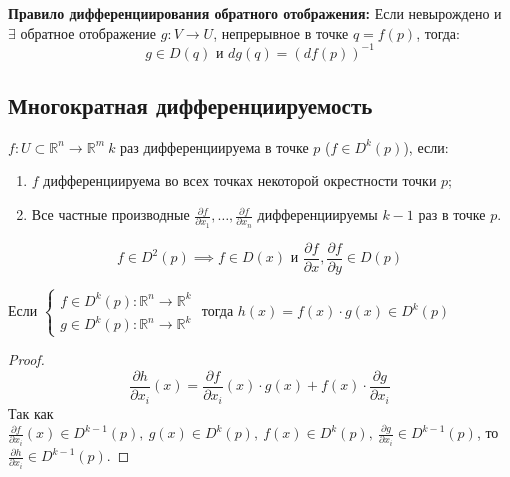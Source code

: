 \textbf{Правило дифференциирования обратного отображения:}
Если невырождено и $\exists$ обратное отображение $g:V \to U$, непрерывное в точке $q = f(p)$, тогда:
\[g \in D(q) \text{ и } dg(q) = (df(p))^{-1}\]


\subsection{Многократная дифференциируемость}

\begin{definition}
    $f: U \subset \mathbb{R}^n \to \mathbb{R}^m \ k$ раз дифференциируема в точке $p$ ($f \in D^k(p)$), если:
    \begin{enumerate}
        \item $f$ дифференциируема во всех точках некоторой окрестности точки $p$;
        \item Все частные производные $\frac{\partial f}{\partial x_1}, \dots, \frac{\partial f}{\partial x_n}$ дифференциируемы $k-1$ раз в точке $p$.
    \end{enumerate}  
\end{definition}

\begin{example}
    \[f \in D^2(p) \implies f \in D(x) \text{ и } \frac{\partial f}{\partial x}, \frac{\partial f}{\partial y} \in D(p)  \]
\end{example}

\begin{statement*}
    Если $\begin{cases}
        f \in D^k(p): \mathbb{R}^n \to \mathbb{R}^k\\
        g \in D^k(p): \mathbb{R}^n \to \mathbb{R}^k
    \end{cases}$ тогда $h(x) = f(x) \cdot g(x) \in D^k(p)$

    \begin{proof}
        \begin{equation*}
            \frac{\partial h}{\partial x_i}(x) = \frac{\partial f}{\partial x_i}(x)\cdot g(x) +
            f(x) \cdot \frac{\partial g}{\partial x_i}
        \end{equation*}
        Так как $\frac{\partial f}{\partial x_i}(x) \in D^{k-1}(p), \ g(x) \in D^k(p), \ f(x) \in D^k(p), \ \frac{\partial g}{\partial x_i} \in D^{k-1}(p)$,
        то $\frac{\partial h}{\partial x_i} \in D^{k-1}(p)$.
    \end{proof}
\end{statement*}


